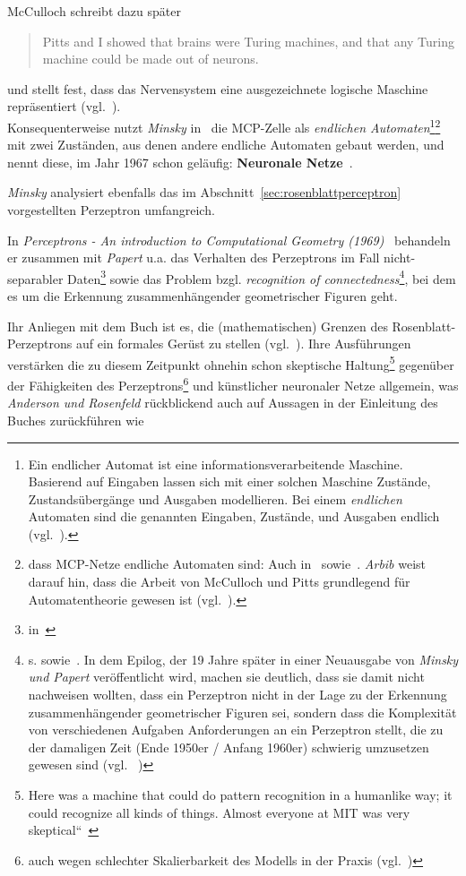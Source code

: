 \noindent
McCulloch schreibt dazu später

\blockquote[{\cite[164]{Mcc16}}]{
    Pitts and I showed that brains were Turing machines, and that any Turing machine could be made out of neurons.
}

\noindent
und stellt fest, dass das Nervensystem eine ausgezeichnete logische Maschine repräsentiert (vgl.~\cite[80]{Mcc16}).\\

\noindent
Konsequenterweise nutzt \textit{Minsky} in~\cite[32 ff.]{Min67} die MCP-Zelle als \textit{endlichen Automaten}\footnote{
    Ein endlicher Automat ist eine informationsverarbeitende Maschine. Basierend auf Eingaben lassen sich mit einer solchen Maschine Zustände, Zustandsübergänge und Ausgaben modellieren. Bei einem \textit{endlichen} Automaten sind die genannten Eingaben, Zustände, und Ausgaben endlich (vgl.~\cite[26 ff.]{SSH95}).
}\footnote{
    dass MCP-Netze endliche Automaten sind: Auch in~\cite[76]{Cow90} sowie~\cite[47, ``Satz 2.4``]{Roj93}. \textit{Arbib} weist darauf hin, dass die Arbeit von McCulloch und Pitts grundlegend für Automatentheorie gewesen ist (vgl.~\cite[8]{Arb19}).
} mit zwei Zuständen, aus denen andere endliche Automaten gebaut werden, und nennt diese, im Jahr 1967 schon geläufig: \textbf{Neuronale Netze}~\cite[33]{Min67}.

%

\textit{Minsky} analysiert ebenfalls das im Abschnitt~\ref{sec:rosenblattperceptron} vorgestellten Perzeptron umfangreich.


In \textit{Perceptrons - An introduction to Computational Geometry (1969)}~\cite{MP88} behandeln er zusammen mit \textit{Papert} u.a. das Verhalten des Perzeptrons im Fall nicht-separabler Daten\footnote{
    in~\cite[181 ff.]{MP88}
} sowie das Problem bzgl. \textit{recognition of connectedness}\footnote{
    s. \cite[12, ``Theorem 0.8``]{MP88} sowie~\cite[249 f.]{MP88}. In dem Epilog, der 19 Jahre später in einer Neuausgabe von \textit{Minsky und Papert} veröffentlicht wird, machen sie deutlich, dass sie damit nicht nachweisen wollten, dass ein Perzeptron nicht in der Lage zu der Erkennung zusammenhängender geometrischer Figuren sei, sondern dass die Komplexität von verschiedenen Aufgaben Anforderungen an ein Perzeptron stellt, die zu der damaligen Zeit (Ende 1950er / Anfang 1960er) schwierig umzusetzen gewesen sind (vgl. ~\cite[250]{MP88})
}, bei dem es um die Erkennung zusammenhängender geometrischer Figuren geht.

Ihr Anliegen mit dem Buch ist es, die (mathematischen) Grenzen des Rosenblatt-Perzeptrons auf ein formales Gerüst zu stellen (vgl.~\cite[249]{MP88}).
Ihre Ausführungen verstärken die zu diesem Zeitpunkt ohnehin schon skeptische Haltung\footnote{
    Here was a machine that could do pattern recognition in a humanlike way; it could recognize all kinds of things. Almost everyone at MIT was very skeptical``~\cite[99]{AR98}
} gegenüber der Fähigkeiten des Perzeptrons\footnote{
    auch wegen schlechter Skalierbarkeit des Modells in der Praxis (vgl.~\cite[159]{AR88})
} und künstlicher neuronaler Netze allgemein, was \textit{Anderson und Rosenfeld} rückblickend auch auf Aussagen in der Einleitung des Buches zurückführen wie

